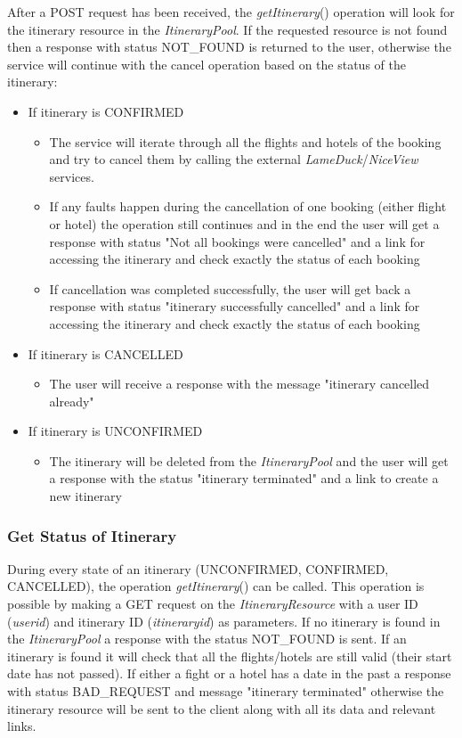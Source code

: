 After a POST request has been received, the \textit{getItinerary}() operation will look for the itinerary resource in the \textit{ItineraryPool}. If the requested resource is not found then a response with status NOT\_FOUND is returned to the user, otherwise the service will continue with the cancel operation based on the status of the itinerary:
\begin{itemize}
\item If itinerary is CONFIRMED
\begin{itemize}
\item The service will iterate through all the flights and hotels of the booking and try to cancel them by calling the external \textit{LameDuck}/\textit{NiceView} services.
\item If any faults happen during the cancellation of one booking (either flight or hotel) the operation still continues and in the end the user will get a response with status "Not all bookings were cancelled" and a link for accessing the itinerary and check exactly the status of each booking
\item If cancellation was completed successfully, the user will get back a response with status "itinerary successfully cancelled" and a link for accessing the itinerary and check exactly the status of each booking
\end{itemize}

\item If itinerary is CANCELLED

\begin{itemize}
\item The user will receive a response with the message "itinerary cancelled already"
\end{itemize}

\item If itinerary is UNCONFIRMED

\begin{itemize}
\item The itinerary will be deleted from the \textit{ItineraryPool} and the user will get a response with the status "itinerary terminated" and a link to create a new itinerary
\end{itemize}

\end{itemize}

\subsubsection*{Get Status of Itinerary}
During every state of an itinerary (UNCONFIRMED, CONFIRMED, CANCELLED), the operation \textit{getItinerary}() can be called. This operation is possible by making a GET request on the \textit{ItineraryResource} with a user ID (\textit{userid}) and itinerary ID (\textit{itineraryid}) as parameters. If no itinerary is found in the \textit{ItineraryPool} a response with the status NOT\_FOUND is sent. 
If an itinerary is found it will check that all the flights/hotels are still valid (their start date has not passed). If either a fight or a hotel has a date in the past a response with status BAD\_REQUEST and message "itinerary terminated" otherwise the itinerary resource will be sent to the client along with all its data and relevant links.

